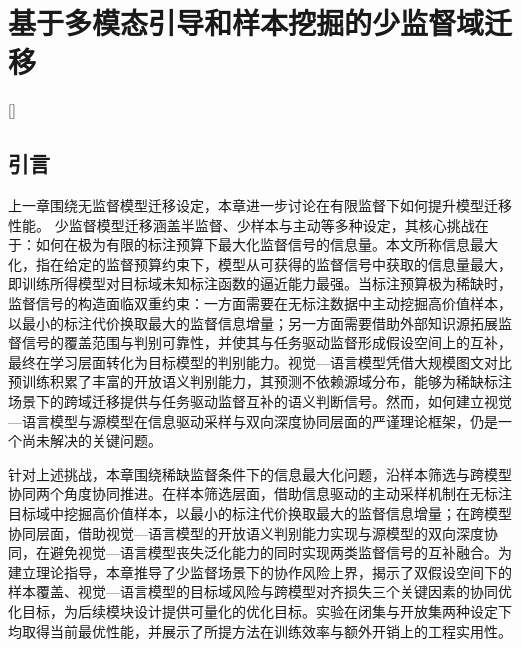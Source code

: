 
\chapter[基于多模态引导和样本挖掘的少监督域迁移]{基于多模态引导和样本挖掘的少监督域迁移}[]

\label{chap:3}

\section{引言}

上一章围绕无监督模型迁移设定，本章进一步讨论在有限监督下如何提升模型迁移性能。
少监督模型迁移涵盖半监督、少样本与主动等多种设定，其核心挑战在于：如何在极为有限的标注预算下最大化监督信号的信息量。本文所称信息最大化，指在给定的监督预算约束下，模型从可获得的监督信号中获取的信息量最大，即训练所得模型对目标域未知标注函数的逼近能力最强。当标注预算极为稀缺时，监督信号的构造面临双重约束：一方面需要在无标注数据中主动挖掘高价值样本，以最小的标注代价换取最大的监督信息增量；另一方面需要借助外部知识源拓展监督信号的覆盖范围与判别可靠性，并使其与任务驱动监督形成假设空间上的互补，最终在学习层面转化为目标模型的判别能力。视觉—语言模型凭借大规模图文对比预训练积累了丰富的开放语义判别能力，其预测不依赖源域分布，能够为稀缺标注场景下的跨域迁移提供与任务驱动监督互补的语义判断信号。然而，如何建立视觉—语言模型与源模型在信息驱动采样与双向深度协同层面的严谨理论框架，仍是一个尚未解决的关键问题。

针对上述挑战，本章围绕稀缺监督条件下的信息最大化问题，沿样本筛选与跨模型协同两个角度协同推进。在样本筛选层面，借助信息驱动的主动采样机制在无标注目标域中挖掘高价值样本，以最小的标注代价换取最大的监督信息增量；在跨模型协同层面，借助视觉—语言模型的开放语义判别能力实现与源模型的双向深度协同，在避免视觉—语言模型丧失泛化能力的同时实现两类监督信号的互补融合。为建立理论指导，本章推导了少监督场景下的协作风险上界，揭示了双假设空间下的样本覆盖、视觉—语言模型的目标域风险与跨模型对齐损失三个关键因素的协同优化目标，为后续模块设计提供可量化的优化目标。实验在闭集与开放集两种设定下均取得当前最优性能，并展示了所提方法在训练效率与额外开销上的工程实用性。

